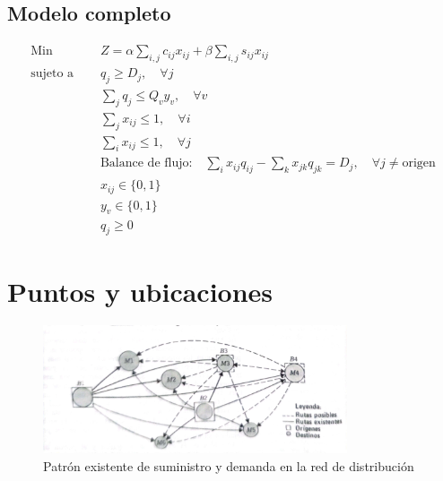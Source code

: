 \documentclass[11pt, a4paper]{article}
\begin{document}
\subsection{Modelo completo}
\begin{align}
\text{Min } & Z = \alpha \sum_{i,j} c_{ij} x_{ij} + \beta \sum_{i,j} s_{ij} x_{ij} \\
\text{sujeto a } \quad & q_{j} \geq D_{j}, \quad \forall j \\
& \sum_{j} q_{j} \leq Q_{v} y_{v}, \quad \forall v \\
& \sum_{j} x_{ij} \leq 1, \quad \forall i \\
& \sum_{i} x_{ij} \leq 1, \quad \forall j \\
& \text{Balance de flujo:} \quad \sum_{i} x_{ij} q_{ij} - \sum_{k} x_{jk} q_{jk} = D_{j}, \quad \forall j \neq \text{origen} \\
& x_{ij} \in \{0,1\} \\
& y_{v} \in \{0,1\} \\
& q_{j} \geq 0  
\end{align}


\section{Puntos y ubicaciones}
\begin{figure}[H]
\centering
\includegraphics[width=0.8\textwidth]{image3.jpg}
\caption{Patrón existente de suministro y demanda en la red de distribución}
\label{fig:suministro_demanda}
\end{figure}
\end{document}
